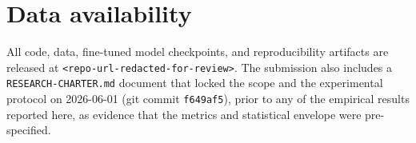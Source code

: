 \section*{Data availability}

All code, data, fine-tuned model checkpoints, and reproducibility artifacts are released at \texttt{<repo-url-redacted-for-review>}. The submission also includes a \texttt{RESEARCH-CHARTER.md} document that locked the scope and the experimental protocol on 2026-06-01 (git commit \texttt{f649af5}), prior to any of the empirical results reported here, as evidence that the metrics and statistical envelope were pre-specified.
